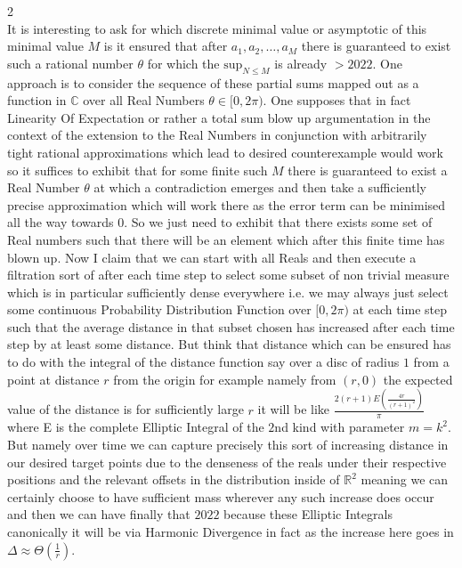 
2 \\
It is interesting to ask for which discrete minimal value or asymptotic of this minimal value $M$ is it ensured that after $a_1, a_2, \dots, a_M$ there is guaranteed to exist such a rational number $\theta$ for which the $\text{sup}_{N \le M}$ is already $> 2022$. One approach is to consider the sequence of these partial sums mapped out as a function in $\mathbb{C}$ over all Real Numbers $\theta \in [0,2 \pi)$. One supposes that in fact Linearity Of Expectation or rather a total sum blow up argumentation in the context of the extension to the Real Numbers in conjunction with arbitrarily tight rational approximations which lead to desired counterexample would work so it suffices to exhibit that for some finite such $M$ there is guaranteed to exist a Real Number $\theta$ at which a contradiction emerges and then take a sufficiently precise approximation which will work there as the error term can be minimised all the way towards $0$. So we just need to exhibit that there exists some set of Real numbers such that there will be an element which after this finite time has blown up. Now I claim that we can start with all Reals and then execute a filtration sort of after each time step to select some subset of non trivial measure which is in particular sufficiently dense everywhere i.e. we may always just select some continuous Probability Distribution Function over $[0,2 \pi)$ at each time step such that the average distance in that subset chosen has increased after each time step by at least some distance. But think that distance which can be ensured has to do with the integral of the distance function say over a disc of radius $1$ from a point at distance $r$ from the origin for example namely from $(r,0)$ the expected value of the distance is for sufficiently large $r$ it will be like $\frac{2(r+1) E \left( \frac{4r}{(r+1)^2} \right)}{\pi}$ where E is the complete Elliptic Integral of the $2$nd kind with parameter $m = k^2$. But namely over time we can capture precisely this sort of increasing distance in our desired target points due to the denseness of the reals under their respective positions and the relevant offsets in the distribution inside of $\mathbb{R}^2$ meaning we can certainly choose to have sufficient mass wherever any such increase does occur and then we can have finally that $2022$ because these Elliptic Integrals canonically it will be via Harmonic Divergence in fact as the increase here goes in $\Delta \approx \Theta \left( \frac{1}{r} \right)$.

